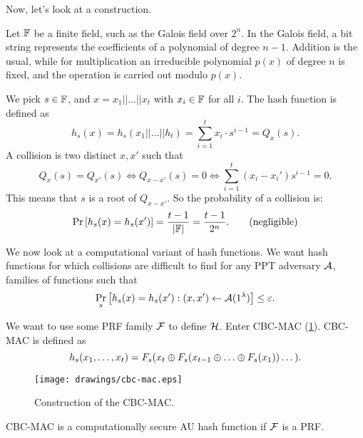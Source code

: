 Now, let's look at a construction.
\begin{construction}
	Let $\Field$ be a finite field, such as the Galois field over $2^n$.
	In the Galois field, a bit string represents the coefficients of a polynomial of degree $n-1$.
	Addition is the usual, while for multiplication an irreducible polynomial $p(x)$ of degree $n$ is fixed, and the operation is carried out modulo $p(x)$.

	We pick $s \in \Field$, and $x = x_1 || \dots || x_t$ with $x_i \in \Field$ for all $i$.
	The hash function is defined as
	\begin{equation*}
		h_s(x) = h_s(x_1 || \dots || h_t) =
		\sum_{i=1}^{t} x_i \cdot s^{i-1} = Q_x(s).
	\end{equation*}
	A collision is two distinct $x, x'$ such that
	\begin{equation*}
		Q_x(s) = Q_{x'}(s) \iff Q_{x-x'}(s) = 0 \iff \sum_{i=1}^{t} (x_i - x_i') s^{i-1} = 0.
	\end{equation*}
	This means that $s$ is a root of $Q_{x-x'}$.
	So the probability of a collision is:
	\begin{equation*}
		\Pr{h_s(x) = h_s(x')} = \frac{t-1}{\abs{\Field}} = \frac{t-1}{2^n}. \tag{negligible}
	\end{equation*}
\end{construction}

We now look at a computational variant of hash functions.
We want hash functions for which collisions are difficult to find for any \ac{PPT} adversary $\Adv$, \ie families of functions such that
\begin{equation*}
	\Pr[s]{h_s(x) = h_s(x') : (x,x') \from \Adv (1^{\lambda})} \le \epsilon.
\end{equation*}

We want to use some \ac{PRF} family $\F$ to define $\H$.
Enter \ac{CBC}-\ac{MAC} (\cref{fig:cbc-mac}).
\ac{CBC}-\ac{MAC} is defined as
\begin{equation*}
	h_s(x_1, \dots, x_t) = F_s(x_t \xor F_s (x_{t-1} \xor \dots \xor F_s(x_1)) \dots).
\end{equation*}

\begin{figure}
	\centering
	\texttt{[image: drawings/cbc-mac.eps]}
	\caption{Construction of the \acs{CBC}-\acs{MAC}.}
	\label{fig:cbc-mac}
\end{figure}

\begin{theorem}
	\ac{CBC}-\ac{MAC} is a computationally secure \ac{AU} hash function if $\F$ is a \ac{PRF}.
\end{theorem}

